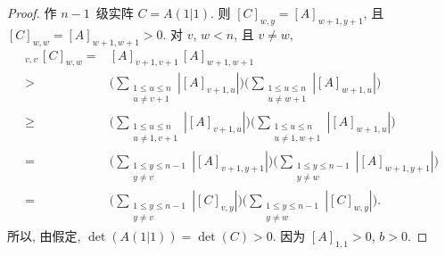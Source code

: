 \documentclass[../libro.tex]{subfiles}
\begin{document}
\begin{proof}
    作 \(n-1\)~级实阵 \(C = A(1 | 1)\).
    则 \([C]_{w,y} = [A]_{w+1,y+1}\),
    且 \([C]_{w,w} = [A]_{w+1,w+1} > 0\).
    对 \(v\), \(w < n\),
    且 \(v \neq w\),
    \begin{align*}
        [C]_{v,v}\, [C]_{w,w}
        = {} &
        [A]_{v+1,v+1}\, [A]_{w+1,w+1}
        \\
        > {} &
        \Bigg(
            \sum_{\substack{1 \leq u \leq n \\ u \neq v+1}}
            {|[A]_{v+1,u}|}
        \Bigg)
        \Bigg(
            \sum_{\substack{1 \leq u \leq n \\ u \neq w+1}}
            {|[A]_{w+1,u}|}
        \Bigg)
        \\
        \geq {} &
        \Bigg(
            \sum_{\substack{1 \leq u \leq n \\ u \neq 1, v+1}}
            {|[A]_{v+1,u}|}
        \Bigg)
        \Bigg(
            \sum_{\substack{1 \leq u \leq n \\ u \neq 1, w+1}}
            {|[A]_{w+1,u}|}
        \Bigg)
        \\
        = {} &
        \Bigg(
            \sum_{\substack{1 \leq y \leq n-1 \\ y \neq v}}
            {|[A]_{v+1,y+1}|}
        \Bigg)
        \Bigg(
            \sum_{\substack{1 \leq y \leq n-1 \\ y \neq w}}
            {|[A]_{w+1,y+1}|}
        \Bigg)
        \\
        = {} &
        \Bigg(
            \sum_{\substack{1 \leq y \leq n-1 \\ y \neq v}}
            {|[C]_{v,y}|}
        \Bigg)
        \Bigg(
            \sum_{\substack{1 \leq y \leq n-1 \\ y \neq w}}
            {|[C]_{w,y}|}
        \Bigg).
    \end{align*}
    所以, 由假定, \(\det {(A(1|1))} = \det {(C)} > 0\).
    因为 \([A]_{1,1} > 0\), \(b > 0\).


\end{proof}
\end{document}
